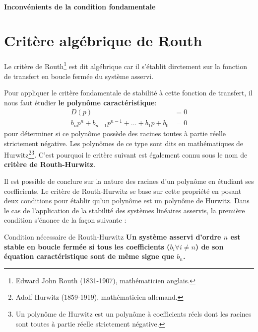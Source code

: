 \paragraph{Inconvénients de la condition fondamentale}

\section{Critère algébrique de Routh}

Le critère de Routh\footnote{Edward John Routh 
(1831-1907), mathématicien anglais.} est dit algébrique car il s'établit 
dirctement sur la fonction de transfert en boucle fermée du système asservi. 

Pour appliquer le critère fondamentale de stabilité à cette fonction de 
transfert, il nous faut étudier \textbf{le polynôme caractéristique}:
\begin{align}
    D(p)&=0 \nonumber\\
    b_np^n+b_{n-1}p^{n-1}+\ldots+b_1p+b_0 &= 0
\end{align}
pour déterminer si ce polynôme possède des racines toutes à partie réelle 
strictement négative. Les polynômes de ce type sont dits en mathématiques 
de Hurwitz\footnote{Adolf Hurwitz (1859-1919), 
mathématicien allemand.}\footnote{Un polynôme de Hurwitz est un polynôme à 
coefficients réels dont les racines sont toutes à partie réelle strictement 
négative.}.
C'est pourquoi le critère suivant est également connu sous le nom de 
\textbf{critère de Routh-Hurwitz}.

Il est possible de conclure sur la nature des racines d'un polynôme 
en étudiant ses coefficients. Le critère de Routh-Hurwitz se base sur 
cette propriété en posant deux conditions pour établir qu'un polynôme est 
un polynôme de Hurwitz. Dans le cas de l'application de la stabilité des 
systèmes linéaires asservis, la première condition s'énonce 
de la façon suivante :
\begin{criteria}{Condition nécessaire de Routh-Hurwitz }
    \textbf{Un système asservi d'ordre $n$ est stable en boucle fermée 
    si tous les coefficients ($b_i\forall i\neq n$) de son équation 
    caractéristique sont de même signe que $b_n$.}
\end{criteria}

